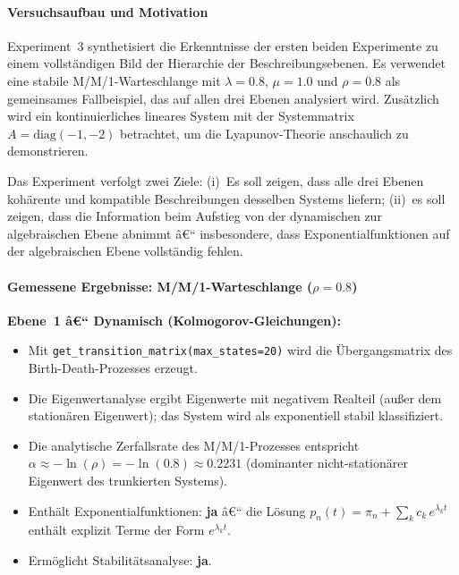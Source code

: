 ﻿\documentclass[a4paper,12pt]{report}
\theoremstyle{definition}
\begin{document}
\paragraph{Versuchsaufbau und Motivation}

Experiment~3 synthetisiert die Erkenntnisse der ersten beiden
Experimente zu einem vollständigen Bild der Hierarchie der
Beschreibungsebenen.  Es verwendet eine stabile M/M/1-Warteschlange
mit $\lambda = 0.8$, $\mu = 1.0$ und $\rho = 0.8$ als gemeinsames
Fallbeispiel, das auf allen drei Ebenen analysiert wird.  Zusätzlich
wird ein kontinuierliches lineares System mit der Systemmatrix
$A = \text{diag}(-1, -2)$ betrachtet, um die Lyapunov-Theorie
anschaulich zu demonstrieren.

Das Experiment verfolgt zwei Ziele: (i)~Es soll zeigen, dass alle drei
Ebenen kohärente und kompatible Beschreibungen desselben Systems
liefern; (ii)~es soll zeigen, dass die Information beim Aufstieg von
der dynamischen zur algebraischen Ebene abnimmt â€“ insbesondere, dass
Exponentialfunktionen auf der algebraischen Ebene vollständig fehlen.

\paragraph{Gemessene Ergebnisse: M/M/1-Warteschlange ($\rho = 0.8$)}

\textbf{Ebene~1 â€“ Dynamisch (Kolmogorov-Gleichungen):}
\begin{itemize}
	\item Mit \texttt{get\_transition\_matrix(max\_states=20)} wird die Übergangsmatrix des Birth-Death-Prozesses erzeugt.
	\item Die Eigenwertanalyse ergibt Eigenwerte mit negativem Realteil
	(außer dem stationären Eigenwert); das System wird als
	exponentiell stabil klassifiziert.
	\item Die analytische Zerfallsrate des M/M/1-Prozesses entspricht
	$\alpha \approx -\ln(\rho) = -\ln(0.8) \approx 0.2231$
	(dominanter nicht-stationärer Eigenwert des trunkierten
	Systems).
	\item Enthält Exponentialfunktionen: \textbf{ja} â€“ die Lösung
	$p_n(t) = \pi_n + \sum_k c_k\,e^{\lambda_k t}$ enthält
	explizit Terme der Form $e^{\lambda_k t}$.
	\item Ermöglicht Stabilitätsanalyse: \textbf{ja}.
\end{itemize}
\end{document}
